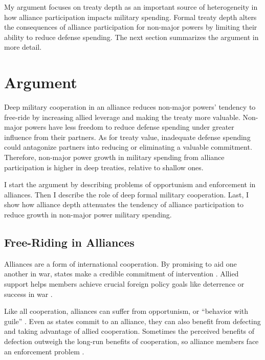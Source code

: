 \documentclass[12pt]{article}
\begin{document}
My argument focuses on treaty depth as an important source of heterogeneity in how alliance participation impacts military spending. 
Formal treaty depth alters the consequences of alliance participation for non-major powers by limiting their ability to reduce defense spending. 
The next section summarizes the argument in more detail. 



\section{Argument}

Deep military cooperation in an alliance reduces non-major powers' tendency to free-ride by increasing allied leverage and making the treaty more valuable. 
Non-major powers have less freedom to reduce defense spending under greater influence from their partners. 
As for treaty value, inadequate defense spending could antagonize partners into reducing or eliminating a valuable commitment. 
Therefore, non-major power growth in military spending from alliance participation is higher in deep treaties, relative to shallow ones. 


I start the argument by describing problems of opportunism and enforcement in alliances. 
Then I describe the role of deep formal military cooperation. 
Last, I show how alliance depth attenuates the tendency of alliance participation to reduce growth in non-major power military spending. 


\subsection{Free-Riding in Alliances}

Alliances are a form of international cooperation. 
By promising to aid one another in war, states make a credible commitment of intervention \citep{Fearon1997, Morrow2000}. 
Allied support helps members achieve crucial foreign policy goals like deterrence or success in war \citep{Walt1990, Snyder1997}. 


Like all cooperation, alliances can suffer from opportunism, or ``behavior with guile'' \citep{Williamson1985}. 
Even as states commit to an alliance, they can also benefit from defecting and taking advantage of allied cooperation. 
Sometimes the perceived benefits of defection outweigh the long-run benefits of cooperation, so alliance members face an enforcement problem \citep{Fearon1998a, Koremenosetal2001}.
\end{document}
